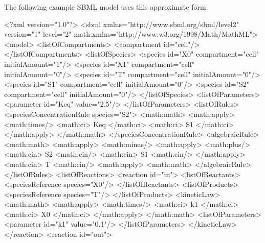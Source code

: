 \documentclass[10pt]{cekarticle}
\begin{document}
The following example SBML model uses this approximate form.

\begin{example}
<?xml version="1.0"?>
<sbml xmlns="http://www.sbml.org/sbml/level2" version="1" level="2"
      math:xmlns="http://www.w3.org/1998/Math/MathML">
    <model>
        <listOfCompartments>
            <compartment id="cell"/>
        </listOfCompartments>
        <listOfSpecies>
            <species id="X0" compartment="cell" initialAmount="1"/>
            <species id="X1" compartment="cell" initialAmount="0"/>
            <species id="T" compartment="cell" initialAmount="0"/>
            <species id="S1" compartment="cell" initialAmount="0"/>
            <species id="S2" compartment="cell" initialAmount="0"/>
        </listOfSpecies>
        <listOfParameters>
            <parameter id="Keq" value="2.5"/>
        </listOfParameters>
        <listOfRules>
            <speciesConcentrationRule species="S2">
                <math:math>
                    <math:apply>
                        <math:times/>
                        <math:ci> Keq </math:ci>
                        <math:ci> S1 </math:ci>
                    </math:apply>
                </math:math>
            </speciesConcentrationRule>
            <algebraicRule>
                <math:math>
                    <math:apply>
                        <math:minus/>
                        <math:apply>
                            <math:plus/>
                            <math:cin> S2 <math:cin/>
                            <math:cin> S1 <math:cin/>
                        </math:apply>
                        <math:cin> T <math:cin/>
                    <math:apply>
                <math:math>
            </algebraicRule>
        </listOfRules>
        <listOfReactions>
            <reaction id="in">
                <listOfReactants>
                    <speciesReference species="X0"/>
                </listOfReactants>
                <listOfProducts>
                    <speciesReference species="T"/>
                </listOfProducts>
                <kineticLaw>
                    <math:math>
                        <math:apply>
                            <math:times/>
                            <math:ci> k1 </math:ci>
                            <math:ci> X0 </math:ci>
                        </math:apply>
                    </math:math>
                    <listOfParameters>
                        <parameter id="k1" value="0.1"/>
                    </listOfParameters>
                </kineticLaw>
            </reaction>
            <reaction id="out">

\end{example}
\end{document}

